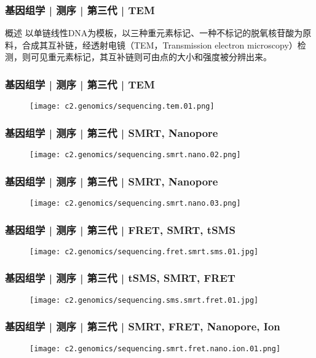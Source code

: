 \begin{frame}
  \frametitle{基因组学 | 测序 | 第三代 | TEM}
  \begin{block}{概述}
以单链线性DNA为模板，以三种重元素标记、一种不标记的脱氧核苷酸为原料，合成其互补链，经透射电镜（TEM，Transmission electron microscopy）检测，则可见重元素标记，其互补链则可由点的大小和强度被分辨出来。
  \end{block}
\end{frame}

\begin{frame}
  \frametitle{基因组学 | 测序 | 第三代 | TEM}
  \begin{figure}
    \centering
    \texttt{[image: c2.genomics/sequencing.tem.01.png]}
  \end{figure}
\end{frame}

\begin{frame}
  \frametitle{基因组学 | 测序 | 第三代 | SMRT, Nanopore}
  \begin{figure}
    \centering
    \texttt{[image: c2.genomics/sequencing.smrt.nano.02.png]}
  \end{figure}
\end{frame}

\begin{frame}
  \frametitle{基因组学 | 测序 | 第三代 | SMRT, Nanopore}
  \begin{figure}
    \centering
    \texttt{[image: c2.genomics/sequencing.smrt.nano.03.png]}
  \end{figure}
\end{frame}

\begin{frame}
  \frametitle{基因组学 | 测序 | 第三代 | FRET, SMRT, tSMS}
  \begin{figure}
    \centering
    \texttt{[image: c2.genomics/sequencing.fret.smrt.sms.01.jpg]}
  \end{figure}
\end{frame}

\begin{frame}
  \frametitle{基因组学 | 测序 | 第三代 | tSMS, SMRT, FRET}
  \begin{figure}
    \centering
    \texttt{[image: c2.genomics/sequencing.sms.smrt.fret.01.jpg]}
  \end{figure}
\end{frame}

\begin{frame}
  \frametitle{基因组学 | 测序 | 第三代 | SMRT, FRET, Nanopore, Ion}
  \begin{figure}
    \centering
    \texttt{[image: c2.genomics/sequencing.smrt.fret.nano.ion.01.png]}
  \end{figure}
\end{frame}

